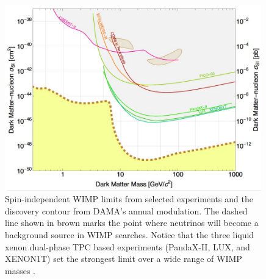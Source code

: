 \begin{figure}[t]
	\centering
	\includegraphics[width=0.99\textwidth]{dm_si_limits}
	\caption{Spin-independent WIMP limits from selected experiments and the discovery contour from DAMA's annual modulation.  The dashed line shown in brown marks the point where neutrinos will become a background source in WIMP searches.  Notice that the three liquid xenon dual-phase TPC based experiments (PandaX-II, LUX, and XENON1T) set the strongest limit over a wide range of WIMP masses \cite{agnese2015improved, armengaud2016constraints, savage2009compatibility, amole2017dark, tan2016dark, akerib2017results, aprile2017first, angloher2016results, ruppin2014complementarity}.}
	\label{fig:dm_si_limits}
\end{figure}




